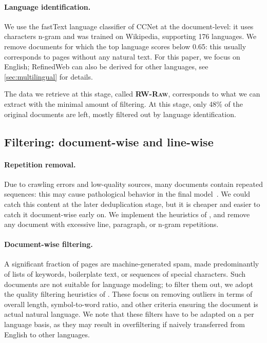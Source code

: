 \paragraph{Language identification.} We use the fastText language classifier of CCNet \cite{wenzek2020ccnet} at the document-level: it uses characters n-gram and was trained on Wikipedia, supporting 176 languages. We remove documents for which the top language scores below 0.65: this usually corresponds to pages without any natural text. For this paper, we focus on English; RefinedWeb can also be derived for other languages, see \ref{sec:multilingual} for details.

The data we retrieve at this stage, called \textcolor{rw_raw}{\textsc{\textbf{RW-Raw}}}, corresponds to what we can extract with the minimal amount of filtering. At this stage, only 48\% of the original documents are left, mostly filtered out by language identification.

\subsection{Filtering: document-wise and line-wise}

\paragraph{Repetition removal.} Due to crawling errors and low-quality sources, many documents contain repeated sequences: this may cause pathological behavior in the final model~\cite{holtzman2019curious}. We could catch this content at the later deduplication stage, but it is cheaper and easier to catch it document-wise early on. We implement the heuristics of \citet{gopher}, and remove any document with excessive line, paragraph, or n-gram repetitions.

\paragraph{Document-wise filtering.} A significant fraction of pages are machine-generated spam, made predominantly of lists of keywords, boilerplate text, or sequences of special characters. Such documents are not suitable for language modeling; to filter them out, we adopt the quality filtering heuristics of \citet{gopher}. These focus on removing outliers in terms of overall length, symbol-to-word ratio, and other criteria ensuring the document is actual natural language. We note that these filters have to be adapted on a per language basis, as they may result in overfiltering if naively transferred from English to other languages. 

